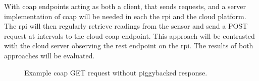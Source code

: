 With \gls{coap} endpoints acting as both a client, that sends requests, and a 
server implementation of \gls{coap} will be needed 
in each the \gls{rpi} and the cloud platform. The \gls{rpi} will then regularly 
retrieve readings from the sensor and send a POST request 
at intervals to the cloud \gls{coap} endpoint. This approach will be contrasted 
with the cloud server observing the \gls{rest} endpoint on the \gls{rpi}.
The results of both approaches will be evaluated.

\begin{figure}[H]
    \centering
    \caption{\label{fig:coap_get_delayed} Example \gls{coap} GET request without 
    piggybacked response. \citep{shelby_constrained_2014}}
\end{figure}
